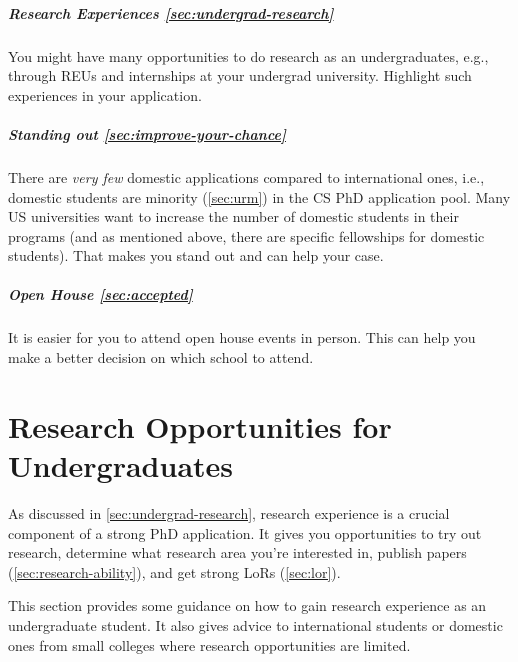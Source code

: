 \documentclass[oneside,11pt,dvipsnames]{book}
\newenvironment{domesticbox}[1][]{
  \small
  \begin{mydomesticbox}
    {\small \textbf{#1}}
  }{
  \end{mydomesticbox}
}
\begin{document}
\paragraph{Research Experiences \autoref{sec:undergrad-research}} You might have many opportunities to do research as an undergraduates, e.g., through REUs and internships at your undergrad university.  Highlight such experiences in your application.

\paragraph{Standing out \autoref{sec:improve-your-chance}} There are \emph{very few} domestic applications compared to international ones, i.e., domestic students are minority (\autoref{sec:urm}) in the CS PhD application pool. Many US universities want to increase the number of domestic students in their programs (and as mentioned above, there are specific fellowships for domestic students).
That makes you stand out and can help your case.

\paragraph{Open House \autoref{sec:accepted}} It is easier for you to attend open house events in person.  This can help you make a better decision on which school to attend.


\chapter{Research Opportunities for Undergraduates}\label{sec:undergrad-research}


As discussed in \autoref{sec:undergrad-research}, research experience is a crucial component of a strong PhD application. It gives you opportunities to try out research, determine what research area you're interested in, publish papers (\autoref{sec:research-ability}), and get strong LoRs (\autoref{sec:lor}).

 This section provides some guidance on how to gain research experience as an undergraduate student.  It also gives advice to international students or domestic ones from small colleges where research opportunities are limited.
\end{document}
